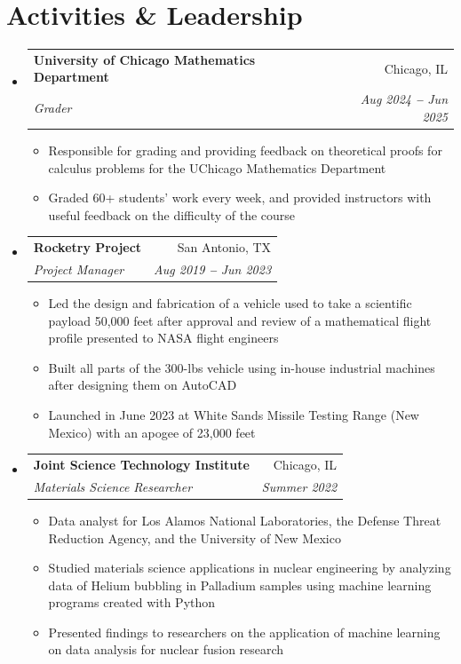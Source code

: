 \documentclass[letterpaper,11pt]{article}
\makeatletter
\newcommand{\resumeItem}[1]{
  \item\small{
    {#1 \vspace{-2pt}}
  }
}
\newcommand{\resumeSubheading}[4]{
  \vspace{-2pt}\item
    \begin{tabular*}{0.97\textwidth}[t]{l@{\extracolsep{\fill}}r}
      \textbf{#1} & #2 \\
      \textit{\small#3} & \textit{\small #4} \\
    \end{tabular*}\vspace{-7pt}
}
\newcommand{\educationSubHeadingListStart}{\begin{itemize}[leftmargin=0in, label={}, itemsep=-1.5pt, parsep=0pt, topsep=-2pt]}
\newcommand{\educationSubHeadingListEnd}{\end{itemize}}
\newcommand{\resumeSubHeadingListStart}{\begin{itemize}[leftmargin=0in, label={}]}
\newcommand{\resumeSubHeadingListEnd}{\end{itemize}}
\newcommand{\resumeItemListStart}{\begin{itemize}}
\newcommand{\resumeItemListEnd}{\end{itemize}\vspace{-5pt}}
\makeatother
\begin{document}

\section{Activities \& Leadership}
  \vspace{3pt}
  \resumeSubHeadingListStart
    \resumeSubheading
      {University of Chicago Mathematics Department}{Chicago, IL}
      {Grader}{Aug 2024 \textbf{--} Jun 2025}
        \resumeItemListStart
            \resumeItem{Responsible for grading and providing feedback on theoretical proofs for calculus problems for the UChicago Mathematics Department}
            \resumeItem{Graded 60+ students' work every week, and provided instructors with useful feedback on the difficulty of the course}
        \resumeItemListEnd
    \resumeSubheading
      {Rocketry Project}{San Antonio, TX}
      {Project Manager}{Aug 2019 \textbf{--} Jun 2023}
        \resumeItemListStart
            \resumeItem{Led the design and fabrication of a vehicle used to take a scientific payload 50,000 feet after approval and review of a mathematical flight profile presented to NASA flight engineers}
            \resumeItem{Built all parts of the 300-lbs vehicle using in-house industrial machines after designing them on AutoCAD}
            \resumeItem{Launched in June 2023 at White Sands Missile Testing Range (New Mexico) with an apogee of 23,000 feet}
        \resumeItemListEnd
    \resumeSubheading
      {Joint Science Technology Institute}{Chicago, IL}
      {Materials Science Researcher}{Summer 2022}
        \resumeItemListStart
            \resumeItem{Data analyst for Los Alamos National Laboratories, the Defense Threat Reduction Agency, and the University of New Mexico}
            \resumeItem{Studied materials science applications in nuclear engineering by analyzing data of Helium bubbling in Palladium samples using machine learning programs created with Python}
            \resumeItem{Presented findings to researchers on the application of machine learning on data analysis for nuclear fusion research}
        \resumeItemListEnd 
  \resumeSubHeadingListEnd


\section{}
  \educationSubHeadingListStart
    \small{\fontsize{8}{10.8}}
    \small{\fontsize{8}{10.8}}
    \small{\fontsize{8}{10.8}}
    
  \educationSubHeadingListEnd

\end{document}
